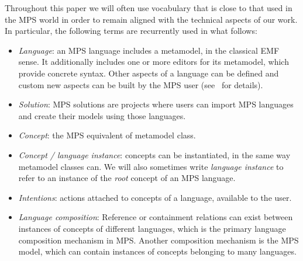 Throughout this paper we will often use vocabulary that is close to that used in
the MPS world in order to remain aligned with the technical aspects of our
work. In particular, the following terms are recurrently used in what follows:
\vspace{-.1cm}
\begin{itemize}
  \item \emph{Language}: an MPS language includes a metamodel, in the classical
  EMF sense. It additionally includes one or more editors for its metamodel,
  which provide concrete syntax. Other aspects of a language
  can be defined and custom new aspects can be
  built by the MPS user (see~\cite{mps} for details).
  \item \emph{Solution}: MPS solutions are projects where users can import
  MPS languages and create their models using those languages.
  \item \emph{Concept}: the MPS equivalent of metamodel class.
  \item \emph{Concept / language instance}: concepts can be instantiated, in
  the same way metamodel classes can. We will also sometimes write
  \emph{language instance} to refer to an instance of the \emph{root} concept of
  an MPS language.
  \item \emph{Intentions}: actions attached to
  concepts of a language, available to the user. 
  \item \emph{Language composition}:  Reference or containment relations can exist between instances of
  concepts of different languages, which is the primary language composition
  mechanism in MPS.
 Another composition mechanism is the MPS model, which can contain instances of
 concepts belonging to many languages.
\end{itemize}
\vspace{-.5cm}
